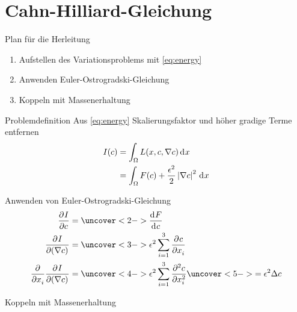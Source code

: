 
\section{Cahn-Hilliard-Gleichung}

\begin{frame}{Plan für die Herleitung}
\begin{enumerate}
\item Aufstellen des Variationsproblems mit \eqref{eq:energy}
\item Anwenden Euler-Ostrogradski-Gleichung
\item Koppeln mit Massenerhaltung
\end{enumerate}
\end{frame}

\begin{frame}{Problemdefinition}
Aus \eqref{eq:energy} Skalierungsfaktor und höher gradige Terme entfernen
\begin{align}
I(c)
&=
\int_\Omega L(x, c, \nabla c) \di{x}
\nonumber
\\
&=
\int_\Omega F(c) + \frac{\epsilon^2}{2} \abs{\nabla c}^2 \di{x}
\end{align}
\end{frame}

\begin{frame}{Anwenden von Euler-Ostrogradski-Gleichung}
\begin{align*}
\pderiv{I}{c}
&=
\uncover<2->{
\deriv{F}{c}
}
\\
\pderiv{I}{(\nabla c)}
&=
\uncover<3->{
\epsilon^2 \sum_{i=1}^3 \pderiv{c}{x_i}
}
\\
\pderiv{}{x_i}\pderiv{I}{(\nabla c)}
&=
\uncover<4->{
\epsilon^2 \sum_{i=1}^3 \pderiv[2]{c}{x_i}
}
\uncover<5->{
=
\epsilon^2 \Delta c
}
\end{align*}
\end{frame}


\begin{frame}{Koppeln mit Massenerhaltung}
\end{frame}

